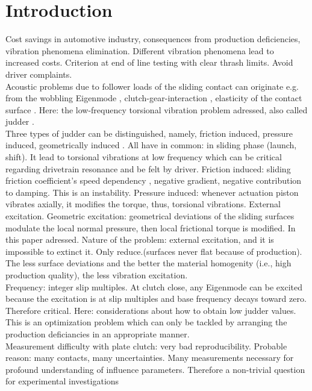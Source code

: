 \documentclass[a4paper,fleqn]{cas-dc}
\begin{document}
\section{Introduction}
Cost savings in automotive industry, consequences from production deficiencies, vibration phenomena elimination. Different vibration phenomena lead to increased costs. Criterion at end of line testing with clear thrash limits. Avoid driver complaints. \\
Acoustic problems due to follower loads of the sliding contact can originate e.g. from the wobbling Eigenmode \cite{fidlin2011minimal,wickramarachi2005analysis}, clutch-gear-interaction \cite{jehle2018nonlinear}, elasticity of the contact surface \cite{hetzler2009moving,jehle2016flexible}. Here: the low-frequency torsional vibration problem adressed, also called judder \cite{klement2011Fahrzeug}.\\
Three types of judder can be distinguished, namely, friction induced, pressure induced, geometrically induced \cite{drexl1990clutch}. All have in common: in sliding phase (launch, shift). It lead to torsional vibrations at low frequency which can be critical regarding drivetrain resonance and be felt by driver. 
Friction induced: sliding friction coefficient's speed dependency \cite{hinrichs1997reibungsschwingungen,kauderer1958nichtlineare}, negative gradient, negative contribution to damping. This is an instability. Pressure induced: whenever actuation piston vibrates axially, it modifies the torque, thus, torsional vibrations. External excitation. 
Geometric excitation: geometrical deviations of the sliding surfaces modulate the local normal pressure, then local frictional torque is modified. In this paper adressed. Nature of the problem: external excitation, and it is impossible to extinct it. Only reduce.(surfaces never flat because of production). The less surface deviations and the better the material homogenity (i.e., high production quality), the less vibration excitation. \\
Frequency: integer slip multiples. At clutch close, any Eigenmode can be excited because the excitation is at slip multiples and base frequency decays toward zero. Therefore critical. Here: considerations about how to obtain low judder values. This is an optimization problem \cite{albers1998Rupfen,dresig2014schwingungen,hausner2012Judder} which can only be tackled by arranging the production deficiancies in an appropriate manner. \\
Measurement difficulty with plate clutch: very bad reproducibility. Probable reason: many contacts, many uncertainties. Many measurements necessary for profound understanding of influence parameters. Therefore a non-trivial question for experimental investigations \cite{ingram2010Clutch} \\
\end{document}
